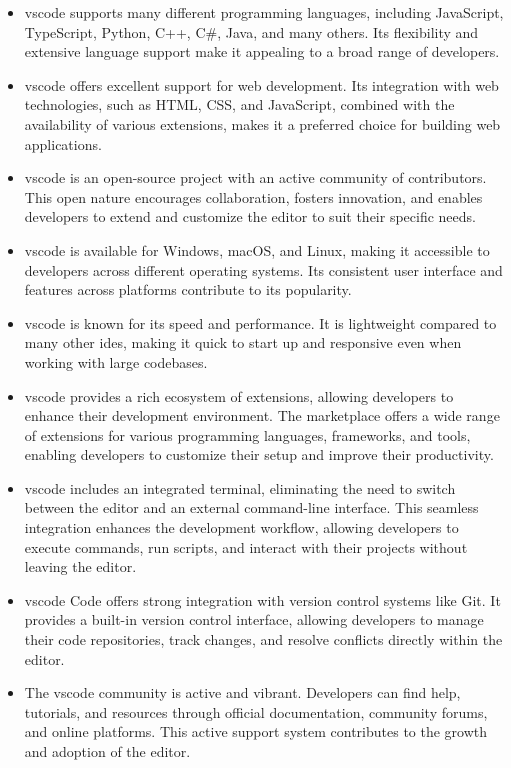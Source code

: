 \begin{itemize}
  \item \gls{vscode} supports many different programming languages, including JavaScript, TypeScript, Python, C++, C\#, Java, and many others. Its flexibility and extensive language support make it appealing to a broad range of developers.
  \item \gls{vscode} offers excellent support for web development. Its integration with web technologies, such as HTML, CSS, and JavaScript, combined with the availability of various extensions, makes it a preferred choice for building web applications.
  \item \gls{vscode} is an open-source project with an active community of contributors. This open nature encourages collaboration, fosters innovation, and enables developers to extend and customize the editor to suit their specific needs.
  \item \gls{vscode} is available for Windows, macOS, and Linux, making it accessible to developers across different operating systems. Its consistent user interface and features across platforms contribute to its popularity.
  \item \gls{vscode} is known for its speed and performance. It is lightweight compared to many other \glspl{ide}, making it quick to start up and responsive even when working with large codebases.
  \item \gls{vscode} provides a rich ecosystem of extensions, allowing developers to enhance their development environment. The marketplace offers a wide range of extensions for various programming languages, frameworks, and tools, enabling developers to customize their setup and improve their productivity.
  \item \gls{vscode} includes an integrated terminal, eliminating the need to switch between the editor and an external command-line interface. This seamless integration enhances the development workflow, allowing developers to execute commands, run scripts, and interact with their projects without leaving the editor.
  \item \gls{vscode} Code offers strong integration with version control systems like Git. It provides a built-in version control interface, allowing developers to manage their code repositories, track changes, and resolve conflicts directly within the editor.
  \item The \gls{vscode} community is active and vibrant. Developers can find help, tutorials, and resources through official documentation, community forums, and online platforms. This active support system contributes to the growth and adoption of the editor.

\end{itemize}
